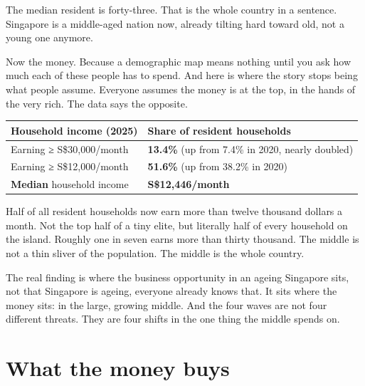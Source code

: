 \documentclass[10pt,twoside,openany]{memoir}
\newcommand{\needspacehead}{\needspace{4\baselineskip}}
\let\oldsection\section
\renewcommand{\section}{\needspacehead\oldsection}
\renewcommand{\arraystretch}{1.1}
\begin{document}
{{{{{{{{{{{{{{The median resident is forty-three. That is the whole country in a
sentence. Singapore is a middle-aged nation now, already tilting hard
toward old, not a young one anymore.

Now the money. Because a demographic map means nothing until you ask how
much each of these people has to spend. And here is where the story
stops being what people assume. Everyone assumes the money is at the
top, in the hands of the very rich. The data says the opposite.

{\def\LTcaptype{none} %
{\renewcommand{\arraystretch}{0.9}\begin{longtable}[]{@{}
  >{\raggedright\arraybackslash}p{}
  >{\raggedright\arraybackslash}p{}@{}}
\toprule\noalign{}
\begin{minipage}[b]{\linewidth}\raggedright
Household income (2025)
\end{minipage} & \begin{minipage}[b]{\linewidth}\raggedright
Share of resident households
\end{minipage} \\
\midrule\noalign{}
\endhead
\bottomrule\noalign{}
\endlastfoot
Earning ≥ S\$30,000/month & \textbf{13.4\%} (up from 7.4\% in 2020,
nearly doubled) \\
Earning ≥ S\$12,000/month & \textbf{51.6\%} (up from 38.2\% in 2020) \\
\textbf{Median} household income & \textbf{S\$12,446/month} \\
\end{longtable}
}

Half of all resident households now earn more than twelve thousand
dollars a month. Not the top half of a tiny elite, but literally half of
every household on the island. Roughly one in seven earns more than
thirty thousand. The middle is not a thin sliver of the population. The
middle is the whole country.

The real finding is where the business opportunity in an ageing
Singapore sits, not that Singapore is ageing, everyone already knows
that. It sits where the money sits: in the large, growing middle. And
the four waves are not four different threats. They are four shifts in
the one thing the middle spends on.

\section{What the money buys}\label{what-the-money-buys}

}}}}}}}}}}}}}}}
\end{document}
